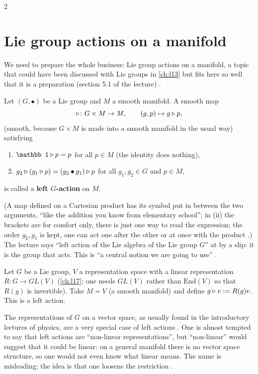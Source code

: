\begin{paracol}{2}
\section{Lie group actions on a manifold}\label{sec:pb-actions}

We need to prepare the whole business: Lie group actions on a manifold, a topic that could have been discussed with Lie groups in \cref{ch:l13} but fits here so well that it is a preparation (section 5.1 of the lecture)  .

\begin{definition}\label{def:pb-left}
Let $(G,\bullet)$ be a Lie group and $M$ a smooth manifold. A smooth map
\[
  \mathbin{\triangleright}\colon G\times M\to M,\qquad(g,p)\mapsto g\mathbin{\triangleright} p ,
\]
(smooth, because $G\times M$ is made into a smooth manifold in the usual way) satisfying
\begin{enumerate}
  \item[(i)] $\mathbb 1\lact p=p$ for all $p\in M$ (the identity does nothing),
  \item[(ii)] $g_2\mathbin{\triangleright}(g_1\mathbin{\triangleright} p)=(g_2\bullet g_1)\mathbin{\triangleright} p$ for all $g_1,g_2\in G$ and $p\in M$,
\end{enumerate}
is called a \textbf{left $G$-action} on $M$.       
\end{definition}
(A map defined on a Cartesian product has its symbol put in between the two arguments, ``like the addition you know from elementary school''; in (ii) the brackets are for comfort only, there is just one way to read the expression; the order $g_2,g_1$ is kept, one can act one after the other or at once with the product  .) The lecture says ``left action of the Lie algebra of the Lie group $G$'' at  by a slip: it is the group that acts. This is ``a central notion we are going to use''  .

\begin{example}\label{ex:pb-rep-action}
Let $G$ be a Lie group, $V$ a representation space with a linear representation $R\colon G\to GL(V)$ (\cref{ch:l17}; one needs $GL(V)$ rather than $\mathrm{End}(V)$ so that $R(g)$ is invertible). Take $M=V$ (a smooth manifold) and define $g\mathbin{\triangleright} v:=R(g)v$. This is a left action.     
\end{example}
The representations of $G$ on a vector space, as usually found in the introductory lectures of physics, are a very special case of left actions  . One is almost tempted to say that left actions are ``non-linear representations'', but ``non-linear'' would suggest that it could be linear: on a general manifold there is no vector space structure, so one would not even know what linear means. The name is misleading; the idea is that one loosens the restriction  .


\end{paracol}
